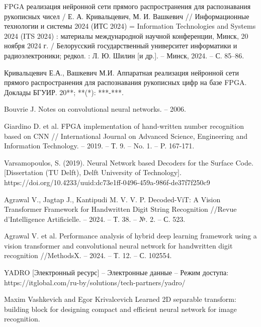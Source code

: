 \begin{thebibliography}{99}
    \setlength{\itemindent}{1.95cm} %
    \setlength{\leftmargin}{1.25cm} %
    \setlength{\labelsep}{2mm} %

    \raggedright%
    \justifying
     FPGA реализация нейронной сети прямого распространения для распознавания рукописных чисел / Е. А. Кривальцевич, М. И. Вашкевич // Информационные технологии и системы 2024 (ИТС 2024) = Information Technologies and Systems 2024 (ITS 2024) : материалы международной научной конференции, Минск, 20 ноября 2024 г. / Белорусский государственный университет информатики и радиоэлектроники; редкол. : Л. Ю. Шилин [и др.]. – Минск, 2024. – С. 85–86.
    
     Кривальцевич Е.А., Вашкевич М.И. Аппаратная реализация нейронной сети прямого распространения для распознавания рукописных цифр на базе FPGA. Доклады БГУИР. 20**; **(*): ***-***.
    
     Bouvrie J. Notes on convolutional neural networks. – 2006.
    
     Giardino D. et al. FPGA implementation of hand-written number recognition based on CNN // International Journal on Advanced Science, Engineering and Information Technology. – 2019. – Т. 9. – No. 1. – P. 167-171. 
    
     Varsamopoulos, S. (2019). Neural Network based Decoders for the Surface Code. [Dissertation (TU Delft), Delft University of Technology]. https://doi.org/10.4233/uuid:dc73e1ff-0496-459a-986f-de37f7f250c9
    
     Agrawal V., Jagtap J., Kantipudi M. V. V. P. Decoded-ViT: A Vision Transformer Framework for Handwritten Digit String Recognition //Revue d'Intelligence Artificielle. – 2024. – Т. 38. – №. 2. – С. 523.
    
     Agrawal V. et al. Performance analysis of hybrid deep learning framework using a vision transformer and convolutional neural network for handwritten digit recognition //MethodsX. – 2024. – Т. 12. – С. 102554.
    
     YADRO [Электронный ресурс] – Электронные данные – Режим доступа: https://itglobal.com/ru-by/solutions/tech-partners/yadro/

     Maxim Vashkevich and Egor Krivalcevich Learned 2D separable transform: building block for designing compact and efficient neural network for image recognition.
    

\end{thebibliography}
